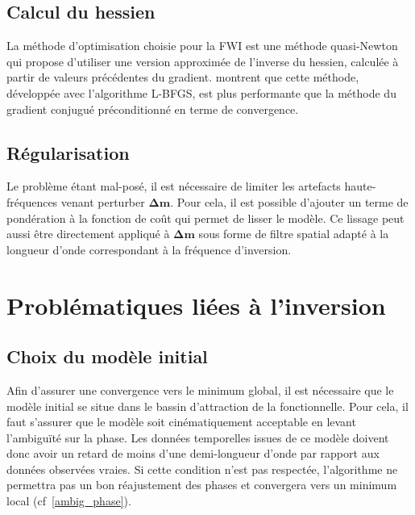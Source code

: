 \subsection{Calcul du hessien}

La méthode d'optimisation choisie pour la FWI est une méthode quasi-Newton qui propose d'utiliser une version approximée de l'inverse du hessien, calculée à partir de valeurs précédentes du gradient.  \cite{brossier_2009} montrent que cette méthode, développée avec l'algorithme L-BFGS, est plus performante que la méthode du gradient conjugué préconditionné en terme de convergence. 

\subsection{Régularisation}

Le problème étant mal-posé, il est nécessaire de limiter les artefacts haute-fréquences venant perturber $\bm{\Delta m}$. Pour cela, il est possible d'ajouter un terme de pondération à la fonction de coût qui permet de lisser le modèle. Ce lissage peut aussi être directement appliqué à $\bm{\Delta m}$ sous forme de filtre spatial adapté à la longueur d'onde correspondant à la fréquence d'inversion.

\section{Problématiques liées à l'inversion}

\subsection{Choix du modèle initial}
Afin d'assurer une convergence vers le minimum global, il est nécessaire que le modèle initial se situe dans le bassin d'attraction de la fonctionnelle. Pour cela, il faut s'assurer que le modèle soit cinématiquement acceptable en levant l’ambiguïté sur la phase. Les données temporelles issues de ce modèle doivent donc avoir un retard de moins d'une demi-longueur d'onde par rapport aux données observées vraies. Si cette condition n'est pas respectée, l'algorithme ne permettra pas un bon réajustement des phases et convergera vers un minimum local (cf~\ref{ambig_phase}).

